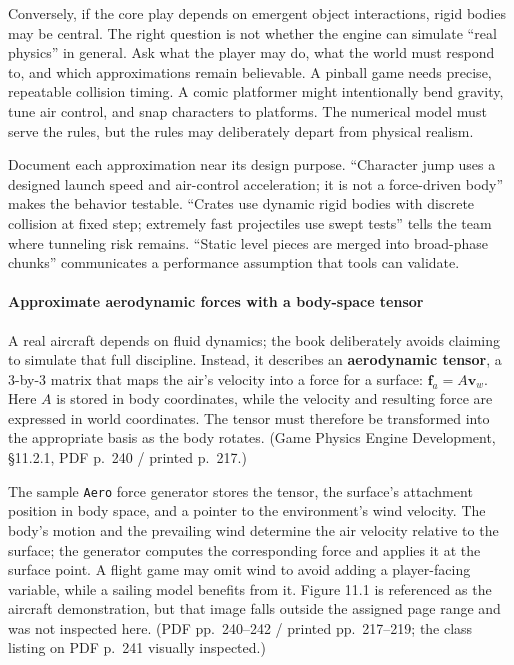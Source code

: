 Conversely, if the core play depends on emergent object interactions, rigid bodies may be central. The right question is not whether the engine can simulate ``real physics'' in general. Ask what the player may do, what the world must respond to, and which approximations remain believable. A pinball game needs precise, repeatable collision timing. A comic platformer might intentionally bend gravity, tune air control, and snap characters to platforms. The numerical model must serve the rules, but the rules may deliberately depart from physical realism.

Document each approximation near its design purpose. ``Character jump uses a designed launch speed and air-control acceleration; it is not a force-driven body'' makes the behavior testable. ``Crates use dynamic rigid bodies with discrete collision at fixed step; extremely fast projectiles use swept tests'' tells the team where tunneling risk remains. ``Static level pieces are merged into broad-phase chunks'' communicates a performance assumption that tools can validate.

\paragraph{Approximate aerodynamic forces with a body-space tensor}\label{06-engine-ii-ch033-approximate-aerodynamic-forces-with-a-body-space-tensor}

A real aircraft depends on fluid dynamics; the book deliberately avoids claiming to simulate that full discipline. Instead, it describes an \textbf{aerodynamic tensor}, a 3-by-3 matrix that maps the air's velocity into a force for a surface: \(\mathbf{f}_a = A\mathbf{v}_w\). Here \(A\) is stored in body coordinates, while the velocity and resulting force are expressed in world coordinates. The tensor must therefore be transformed into the appropriate basis as the body rotates. (Game Physics Engine Development, §11.2.1, PDF p.~240 / printed p.~217.)

The sample \texttt{Aero} force generator stores the tensor, the surface's attachment position in body space, and a pointer to the environment's wind velocity. The body's motion and the prevailing wind determine the air velocity relative to the surface; the generator computes the corresponding force and applies it at the surface point. A flight game may omit wind to avoid adding a player-facing variable, while a sailing model benefits from it. Figure 11.1 is referenced as the aircraft demonstration, but that image falls outside the assigned page range and was not inspected here. (PDF pp.~240--242 / printed pp.~217--219; the class listing on PDF p.~241 visually inspected.)

